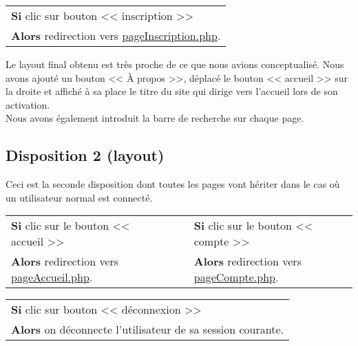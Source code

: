         \begin{center}
            \begin{tabular}{l}
                \textbf{Si} clic sur bouton << inscription >> \\
                \textbf{Alors} redirection vers \underline{pageInscription.php}.
            \end{tabular}
        \end{center}


        \begin{paragraphe}
            Le layout final obtenu est très proche de ce que nous avions conceptualisé. Nous avons ajouté un bouton << À propos >>,
            déplacé le bouton << accueil >> sur la droite et affiché à sa place le titre du site qui dirige vers l'accueil lors de son activation.\\
            Nous avons également introduit la barre de recherche sur chaque page.
        \end{paragraphe}


    \newpage

	\subsection{Disposition 2 (layout)}

		\begin{paragraphe}
			Ceci est la seconde disposition dont toutes les pages vont hériter dans le cas où un utilisateur normal est connecté.
		\end{paragraphe}

        \begin{center}
            \begin{tabular}{l c | c l}
                \textbf{Si} clic sur le bouton << accueil >> & & & \textbf{Si} clic sur le bouton << compte >> \\
                \textbf{Alors} redirection vers \underline{pageAccueil.php}. & & & \textbf{Alors} redirection vers \underline{pageCompte.php}.
            \end{tabular}
        \end{center}
        
        \begin{center}
            \begin{tabular}{l}
                \textbf{Si} clic sur bouton << déconnexion >> \\
                \textbf{Alors} on déconnecte l'utilisateur de sa session courante.
            \end{tabular}
        \end{center}

